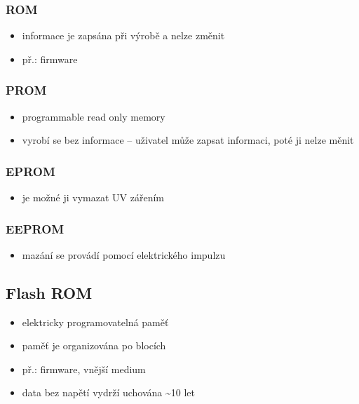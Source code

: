 \documentclass[a4paper,12pt]{article}
\providecommand{\tightlist}{%
\setlength{\itemsep}{0pt}\setlength{\parskip}{0pt}}
\begin{document}
\subsubsection{ROM}

\begin{itemize}
\tightlist
\item informace je zapsána při výrobě a nelze změnit
\item př.: firmware
\end{itemize}

\subsubsection{PROM}

\begin{itemize}
\tightlist
\item programmable read only memory
\item vyrobí se bez informace -- uživatel může zapsat informaci, poté ji
  nelze měnit
\end{itemize}

\subsubsection{EPROM}

\begin{itemize}
\tightlist
\item je možné ji vymazat UV zářením
\end{itemize}

\subsubsection{EEPROM}

\begin{itemize}
\tightlist
\item mazání se provádí pomocí elektrického impulzu
\end{itemize}

\subsection{Flash ROM}

\begin{itemize}
\tightlist
\item elektricky programovatelná paměť
\item paměť je organizována po blocích
\item př.: firmware, vnější medium
\item data bez napětí vydrží uchována \textasciitilde{}10 let
\end{itemize}
\end{document}
